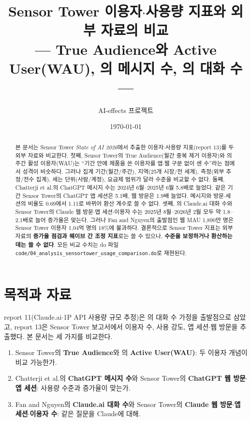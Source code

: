 \documentclass[11pt]{article}
\title{Sensor Tower 이용자$\cdot$사용량 지표와 외부 자료의 비교\\[2mm]
\large --- True Audience와 Active User(WAU), \citeauthor{chatterji-2025-how-people-use-chatgpt}의 메시지 수, \citeauthor{fan-2026-aggregate-gains-from-ai}의 대화 수 ---}
\author{AI-effects 프로젝트}
\date{\today}
\begin{document}
\maketitle

\begin{abstract}
\noindent 본 문서는 Sensor Tower \textit{State of AI 2026}\parencite{sensortower-2026-state-of-ai}에서 추출한 이용자$\cdot$사용량 지표(report 13)를 두 외부 자료와 비교한다. 첫째, Sensor Tower의 True Audience(월간 중복 제거 이용자)와 \textcite{chatterji-2025-how-people-use-chatgpt}의 주간 활성 이용자(WAU)는 ``기간 안에 제품을 쓴 이용자를 앱$\cdot$웹 구분 없이 센 수''라는 점에서 성격이 비슷하다. 그러나 집계 기간(월간/주간), 지역(25개 시장/전 세계), 측정(외부 추정/전수 집계), 세는 단위(사람/계정), 요금제 범위가 달라 수준을 비교할 수 없다. 둘째, Chatterji et al.의 ChatGPT 메시지 수는 2024년 6월--2025년 6월 5.8배로 늘었다. 같은 기간 Sensor Tower의 ChatGPT 앱 세션은 5.1배, 웹 방문은 1.9배 늘었다. 메시지와 방문$\cdot$세션의 비율도 0.69에서 1.11로 바뀌어 환산 계수로 쓸 수 없다. 셋째, \textcite{fan-2026-aggregate-gains-from-ai}의 Claude.ai 대화 수와 Sensor Tower의 Claude 웹 방문$\cdot$앱 세션$\cdot$이용자 수는 2025년 8월--2026년 2월 모두 약 1.8--2.1배로 늘어 증가율은 맞는다. 그러나 Fan and Nguyen의 출발점인 웹 MAU 1,890만 명은 Sensor Tower 이용자 1.04억 명의 18\%에 불과하다. 결론적으로 Sensor Tower 지표는 외부 자료의 \textbf{증가율 점검과 웨이브 간 조정 지표}로는 쓸 수 있으나, \textbf{수준을 보정하거나 환산하는 데는 쓸 수 없다}. 모든 비교 수치는 do 파일 \texttt{code/04\_analysis\_sensortower\_usage\_comparison.do}로 재현된다.
\end{abstract}

\tableofcontents

\section{목적과 자료}

report 11(Claude.ai$\cdot$1P API 사용량 규모 추정)은 \textcite{fan-2026-aggregate-gains-from-ai}의 대화 수 가정을 출발점으로 삼았고, report 13은 Sensor Tower 보고서에서 이용자 수, 사용 강도, 앱 세션$\cdot$웹 방문을 추출했다. 본 문서는 세 가지를 비교한다.

\begin{enumerate}[label=(\arabic*)]
  \item Sensor Tower의 \textbf{True Audience}와 \textcite{chatterji-2025-how-people-use-chatgpt}의 \textbf{Active User(WAU)}: 두 이용자 개념이 비교 가능한가.
  \item Chatterji et al.의 \textbf{ChatGPT 메시지 수}와 Sensor Tower의 \textbf{ChatGPT 웹 방문$\cdot$앱 세션}: 사용량 수준과 증가율이 맞는가.
  \item Fan and Nguyen의 \textbf{Claude.ai 대화 수}와 Sensor Tower의 \textbf{Claude 웹 방문$\cdot$앱 세션$\cdot$이용자 수}: 같은 질문을 Claude에 대해.
\end{enumerate}
\end{document}
